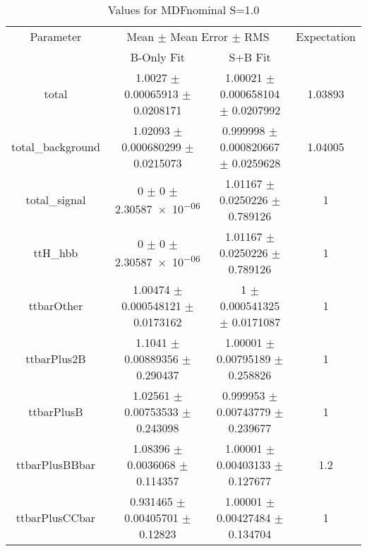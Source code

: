 \begin{table}
\centering
\caption{Values for MDFnominal S=1.0}
\begin{tabular}{cccc}
\toprule
Parameter & \multicolumn{2}{c}{Mean $\pm$ Mean Error $\pm$ RMS} & Expectation\\
 & B-Only Fit & S+B Fit & \\
\midrule
total & \num{1.0027} $\pm$ \num{0.00065913} $\pm$ \num{0.0208171} & \num{1.00021} $\pm$ \num{0.000658104} $\pm$ \num{0.0207992} & \num{1.03893}\\
total\_background & \num{1.02093} $\pm$ \num{0.000680299} $\pm$ \num{0.0215073} & \num{0.999998} $\pm$ \num{0.000820667} $\pm$ \num{0.0259628} & \num{1.04005}\\
total\_signal & \num{0} $\pm$ \num{0} $\pm$ \num{2.30587e-06} & \num{1.01167} $\pm$ \num{0.0250226} $\pm$ \num{0.789126} & \num{1}\\
ttH\_hbb & \num{0} $\pm$ \num{0} $\pm$ \num{2.30587e-06} & \num{1.01167} $\pm$ \num{0.0250226} $\pm$ \num{0.789126} & \num{1}\\
ttbarOther & \num{1.00474} $\pm$ \num{0.000548121} $\pm$ \num{0.0173162} & \num{1} $\pm$ \num{0.000541325} $\pm$ \num{0.0171087} & \num{1}\\
ttbarPlus2B & \num{1.1041} $\pm$ \num{0.00889356} $\pm$ \num{0.290437} & \num{1.00001} $\pm$ \num{0.00795189} $\pm$ \num{0.258826} & \num{1}\\
ttbarPlusB & \num{1.02561} $\pm$ \num{0.00753533} $\pm$ \num{0.243098} & \num{0.999953} $\pm$ \num{0.00743779} $\pm$ \num{0.239677} & \num{1}\\
ttbarPlusBBbar & \num{1.08396} $\pm$ \num{0.0036068} $\pm$ \num{0.114357} & \num{1.00001} $\pm$ \num{0.00403133} $\pm$ \num{0.127677} & \num{1.2}\\
ttbarPlusCCbar & \num{0.931465} $\pm$ \num{0.00405701} $\pm$ \num{0.12823} & \num{1.00001} $\pm$ \num{0.00427484} $\pm$ \num{0.134704} & \num{1}\\
\bottomrule
\end{tabular}
\end{table}